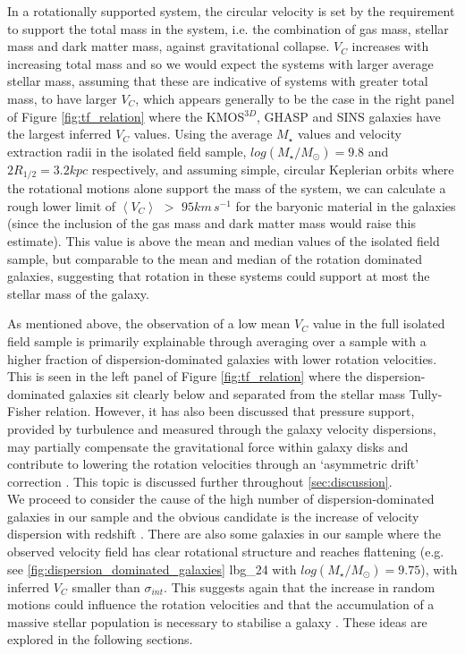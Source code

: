 \documentclass[fleqn,usenatbib]{mnras}
\begin{document}
\noindent
In a rotationally supported system, the circular velocity is set by the requirement to support the total mass in the system, i.e. the combination of gas mass, stellar mass and dark matter mass, against gravitational collapse.
$V_{C}$ increases with increasing total mass and so we would expect the systems with larger average stellar mass, assuming that these are indicative of systems with greater total mass, to have larger $V_{C}$, which appears generally to be the case in the right panel of Figure \ref{fig:tf_relation} where the KMOS$^{3D}$, GHASP and SINS galaxies have the largest inferred $V_{C}$ values.
Using the average $M_{\star}$ values and velocity extraction radii in the isolated field sample, $log(M_{\star}/M_{\odot})=9.8$ and $2R_{1/2} = 3.2kpc$ respectively, and assuming simple, circular Keplerian orbits where the rotational motions alone support the mass of the system, we can calculate a rough lower limit of $\left<V_{C}\right>$ $>$ $95km\,s^{-1}$ for the baryonic material in the galaxies (since the inclusion of the gas mass and dark matter mass would raise this estimate).
This value is above the mean and median values of the isolated field sample, but comparable to the mean and median of the rotation dominated galaxies, suggesting that rotation in these systems could support at most the stellar mass of the galaxy.  

As mentioned above, the observation of a low mean $V_{C}$ value in the full isolated field sample is primarily explainable through averaging over a sample with a higher fraction of dispersion-dominated galaxies with lower rotation velocities.
This is seen in the left panel of Figure \ref{fig:tf_relation} where the dispersion-dominated galaxies sit clearly below and separated from the stellar mass Tully-Fisher relation.
However, it has also been discussed that pressure support, provided by turbulence and measured through the galaxy velocity dispersions, may partially compensate the gravitational force within galaxy disks and contribute to lowering the rotation velocities through an `asymmetric drift' correction \citep[e.g.][]{Burkert2010,Newman2013,Genzel2017}.
This topic is discussed further throughout \cref{sec:discussion}. \\

\noindent
We proceed to consider the cause of the high number of dispersion-dominated galaxies in our sample and the obvious candidate is the increase of velocity dispersion with redshift \citep[e.g.][]{Genzel2006,Genzel2008,ForsterSchreiber2009,Law2009,Gnerucci2011,Epinat2012,Wisnioski2015}.
There are also some galaxies in our sample where the observed velocity field has clear rotational structure and reaches flattening (e.g. see \cref{fig:dispersion_dominated_galaxies} lbg\_24 with $log(M_{\star}/M_{\odot})=9.75$), with inferred $V_{C}$ smaller than $\sigma_{int}$.
This suggests again that the increase in random motions could influence the rotation velocities and that the accumulation of a massive stellar population is necessary to stabilise a galaxy \citep[e.g.][]{Law2009,Law2012b,Law2012c,Newman2013,Wisnioski2015}.
These ideas are explored in the following sections.
\end{document}
